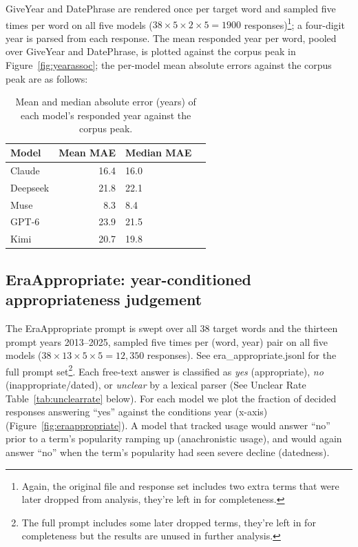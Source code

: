 \documentclass[11pt]{article}
\begin{document}
\noindent GiveYear and DatePhrase are rendered once per target word and sampled five times per word on all five models ($38\times5\times2\times5 = 1900$ responses)\footnote{Again, the original file and response set includes two extra terms that were later dropped from analysis, they're left in for completeness.}; a four-digit year is parsed from each response. The mean responded year per word, pooled over GiveYear and DatePhrase, is plotted against the corpus peak in Figure~\ref{fig:yearassoc}; the per-model mean absolute errors against the corpus peak are as follows:

\begin{table}[htbp]
\centering
\small
\begin{tabular}{lr@{\hskip 2em}lr}
\toprule
Model & Mean MAE & Median MAE \\
\midrule
Claude & 16.4 & 16.0 \\
Deepseek & 21.8 & 22.1 \\
Muse & 8.3 & 8.4 \\
GPT-6 & 23.9 & 21.5 \\
Kimi & 20.7 & 19.8 \\
\bottomrule
\end{tabular}
\caption{Mean and median absolute error (years) of each model's responded year against the corpus peak.}%
\label{tab:yearpromptmae}
\end{table}

\subsection{EraAppropriate: year-conditioned appropriateness judgement}%
\label{app:exp2-era}
The EraAppropriate prompt is swept over all 38 target words and the thirteen prompt years 2013--2025, sampled five times per (word, year) pair on all five models ($38\times13\times5\times5 = 12{,}350$ responses). See era\_appropriate.jsonl for the full prompt set\footnote{The full prompt includes some later dropped terms, they're left in for completeness but the results are unused in further analysis.}. Each free-text answer is classified as \emph{yes} (appropriate), \emph{no} (inappropriate/dated), or \emph{unclear} by a lexical parser (See Unclear Rate Table~\ref{tab:unclearrate} below). For each model we plot the fraction of decided responses answering ``yes'' against the conditions year (x-axis) (Figure~\ref{fig:eraappropriate}). A model that tracked usage would answer ``no'' prior to a term's popularity ramping up (anachronistic usage), and would again answer ``no'' when the term's popularity had seen severe decline (datedness).
\end{document}
